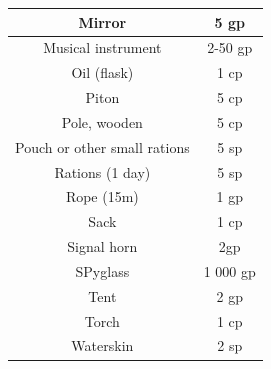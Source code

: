 \begin{longtable}{| c | c |}
Mirror & 5 gp \\ \hline
Musical instrument & 2-50 gp \\ \hline
Oil (flask) & 1 cp \\ \hline
Piton & 5 cp \\ \hline
Pole, wooden & 5 cp \\ \hline
Pouch or other small rations & 5 sp \\ \hline
Rations (1 day) & 5 sp \\ \hline
Rope (15m) & 1 gp \\ \hline
Sack & 1 cp \\ \hline
Signal horn & 2gp \\ \hline
SPyglass & 1 000 gp \\ \hline
Tent & 2 gp \\ \hline
Torch & 1 cp \\ \hline
Waterskin & 2 sp \\ \hline
\end{longtable}

